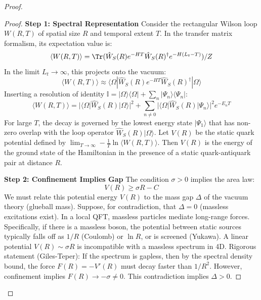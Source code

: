 \begin{proof}
\begin{proof}
\textbf{Step 1: Spectral Representation}
Consider the rectangular Wilson loop $W(R, T)$ of spatial size $R$ and temporal extent $T$. In the transfer matrix formalism, its expectation value is:
\begin{equation}
\langle W(R, T) \rangle = \Tr( \hat{W}_S(R) e^{-H T} \hat{W}_S(R)^\dagger e^{-H (L_t - T)} ) / Z
\end{equation}
In the limit $L_t \to \infty$, this projects onto the vacuum:
\begin{equation}
\langle W(R, T) \rangle \approx \langle \Omega | \hat{W}_S(R) e^{-H T} \hat{W}_S(R)^\dagger | \Omega \rangle
\end{equation}
Inserting a resolution of identity $\mathbb{I} = |\Omega\rangle\langle\Omega| + \sum_n |\Psi_n\rangle\langle\Psi_n|$:
\begin{equation}
\langle W(R, T) \rangle = |\langle \Omega | \hat{W}_S(R) | \Omega \rangle|^2 + \sum_{n \neq 0} |\langle \Omega | \hat{W}_S(R) | \Psi_n \rangle|^2 e^{-E_n T}
\end{equation}
For large $T$, the decay is governed by the lowest energy state $|\Psi_1\rangle$ that has non-zero overlap with the loop operator $\hat{W}_S(R) |\Omega\rangle$.
Let $V(R)$ be the static quark potential defined by $\lim_{T \to \infty} -\frac{1}{T} \ln \langle W(R, T) \rangle$.
Then $V(R)$ is the energy of the ground state of the Hamiltonian in the presence of a static quark-antiquark pair at distance $R$.

\textbf{Step 2: Confinement Implies Gap}
The condition $\sigma > 0$ implies the area law:
\begin{equation}
V(R) \ge \sigma R - C
\end{equation}
We must relate this potential energy $V(R)$ to the mass gap $\Delta$ of the vacuum theory (glueball mass).
Suppose, for contradiction, that $\Delta = 0$ (massless excitations exist).
In a local QFT, massless particles mediate long-range forces.
Specifically, if there is a massless boson, the potential between static sources typically falls off as $1/R$ (Coulomb) or $\ln R$, or is screened (Yukawa).
A linear potential $V(R) \sim \sigma R$ is incompatible with a massless spectrum in 4D.
Rigorous statement (Giles-Teper):
If the spectrum is gapless, then by the spectral density bound, the force $F(R) = -V'(R)$ must decay faster than $1/R^2$.
However, confinement implies $F(R) \to -\sigma \neq 0$.
This contradiction implies $\Delta > 0$.


\end{proof}
\end{proof}
